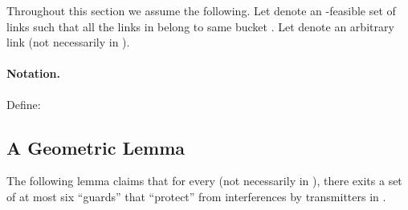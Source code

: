 \documentclass[11pt]{article}
\newenvironment{proof sketch}{\noindent {\bf Proof sketch:} }{\hfill \qed}
\newcommand{\sinr}{\text{\sc{sinr}}}
\begin{document}
Throughout this section we assume the following.
Let  denote an \sinr-feasible set of links such that all the links in 
belong to same bucket .
Let  denote an arbitrary link (not
necessarily in ).
\paragraph{Notation.}
Define:

\medskip

\subsection{A Geometric Lemma}
The following lemma claims that for every  (not necessarily in ), there exits a set of
at most six ``guards'' that ``protect''  from interferences by transmitters in
.
\end{document}
